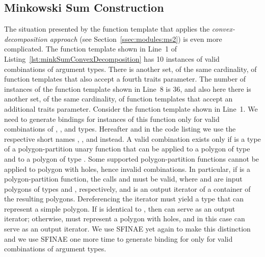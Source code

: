 \subsection{Minkowski Sum Construction}
\label{sec:code:minkSumComputation}
The situation presented by the function template
 that applies the
\emph{convex-decomposition approach} (see
Section~\ref{ssec:modules:ms2}) is even more complicated. The function 
template shown in Line~1 of 
Listing~\ref{lst:minkSumConvexDecomposition} has 10 instances of valid
combinations of argument types. There is another set, of the same
cardinality, of function templates that also accept a fourth traits
parameter. The number of instances of the function template shown in
Line~8 is 36, and also here there is another set, of the same
cardinality, of function templates that accept an additional traits
parameter. Consider the function template shown in Line~1. We need to
generate bindings for instances of this function only for valid
combinations of ,
, and
 types. Hereafter and in
the code listing we use the respective short names ,
, and  instead. A valid combination
exists only if  is a type of a polygon-partition
unary function that can be applied to a polygon of type
 and to a polygon of type . Some
supported polygon-partition functions cannot be applied to polygon
with holes, hence invalid combinations. In particular, if
 is a polygon-partition function, the calls
 and  must be
valid, where  and  are input
polygons of types  and ,
respectively, and  is an output iterator of a
container of the resulting polygons. Dereferencing the iterator must
yield a type that can represent a simple polygon. If 
is identical to , then
 can serve as an output
iterator; otherwise,  must represent a polygon with
holes, and in this case
 can serve as an
output iterator. We use SFINAE yet again to make this distinction and
we use SFINAE one more time to generate binding for
 only for valid combinations of
argument types.

